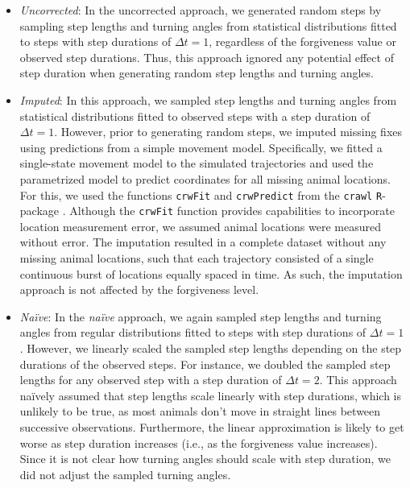 \documentclass[../FinalThesis.tex]{subfiles}
\begin{document}
\begin{itemize}

  \item \textit{Uncorrected}: In the uncorrected approach, we generated random
  steps by sampling step lengths and turning angles from statistical
  distributions fitted to steps with step durations of $\Delta t = 1$,
  regardless of the forgiveness value or observed step durations. Thus, this
  approach ignored any potential effect of step duration when generating random
  step lengths and turning angles.

  \item \textit{Imputed}: In this approach, we sampled step lengths and turning
  angles from statistical distributions fitted to observed steps with a step
  duration of $\Delta t = 1$. However, prior to generating random steps, we
  imputed missing fixes using predictions from a simple movement model.
  Specifically, we fitted a single-state movement model \citep{Johnson.2008} to
  the simulated trajectories and used the parametrized model to predict
  coordinates for all missing animal locations. For this, we used the functions
  \texttt{crwFit} and \texttt{crwPredict} from the \texttt{crawl}
  \texttt{R}-package \citep{Johnson.2024}. Although the \texttt{crwFit} function
  provides capabilities to incorporate location measurement error, we assumed
  animal locations were measured without error. The imputation resulted in a
  complete dataset without any missing animal locations, such that each
  trajectory consisted of a single continuous burst of locations equally spaced
  in time. As such, the imputation approach is not affected by the forgiveness
  level.

  \item \textit{Na\"ive}: In the \textit{na\"ive} approach, we again sampled
  step lengths and turning angles from regular distributions fitted to steps
  with step durations of $\Delta t = 1$. However, we linearly scaled the sampled
  step lengths depending on the step durations of the observed steps. For
  instance, we doubled the sampled step lengths for any observed step with a
  step duration of $\Delta t = 2$. This approach na\"ively assumed that
  step lengths scale linearly with step durations, which is unlikely to be true,
  as most animals don't move in straight lines between successive observations.
  Furthermore, the linear approximation is likely to get worse as step duration
  increases (i.e., as the forgiveness value increases). Since it is not clear
  how turning angles should scale with step duration, we did not adjust the
  sampled turning angles.


\end{itemize}
\end{document}
